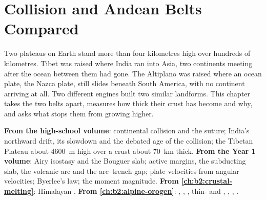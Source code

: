 \chapter{Collision and Andean Belts Compared}\label{ch:b2:himalaya-andes}

Two plateaus on Earth stand more than four kilometres high over hundreds of kilometres.
Tibet was raised where India ran into Asia, two continents meeting after the ocean between
them had gone. The Altiplano was raised where an ocean plate, the Nazca plate, still slides
beneath South America, with no continent arriving at all. Two different engines built two
similar landforms. This chapter takes the two belts apart, measures how thick their crust
has become and why, and asks what stops them from growing higher.

\begin{recall}
\textbf{From the high-school volume}: continental collision and the suture; India's
northward drift, its slowdown and the debated age of the collision; the Tibetan Plateau about
\qty{4600}{m} high over a crust about \qty{70}{km} thick. \textbf{From the Year 1 volume}:
Airy isostasy and the Bouguer slab; active margins, the subducting slab, the volcanic arc and
the arc--trench gap; plate velocities from angular velocities; Byerlee's law; the moment
magnitude. \textbf{From \cref{ch:b2:crustal-melting}}: Himalayan .
\textbf{From \cref{ch:b2:alpine-orogen}}: , , , thin- and
, , , .
\end{recall}

